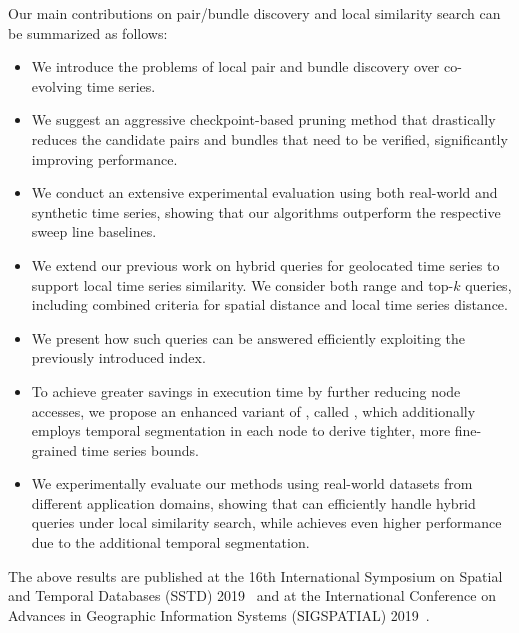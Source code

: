Our main contributions on pair/bundle discovery and local similarity search can be summarized as follows:

\begin{itemize} 
 \item We introduce the problems of local pair and bundle discovery over co-evolving time series.
 \item We suggest an aggressive checkpoint-based pruning method that drastically reduces the candidate pairs and bundles that need to be verified, significantly improving performance.
 \item We conduct an extensive experimental evaluation using both real-world and synthetic time series, showing that our algorithms outperform the respective sweep line baselines.
 \item We extend our previous work on hybrid queries for geolocated time series to support local time series similarity. We consider both range and top-$k$ queries, including combined criteria for spatial distance and local time series distance.
 \item We present how such queries can be answered efficiently exploiting the previously introduced \btsr index.
 \item To achieve greater savings in execution time by further reducing node accesses, we propose an enhanced variant of \btsr, called \sbtsr, which additionally employs temporal segmentation in each node to derive tighter, more fine-grained time series bounds.
 \item We experimentally evaluate our methods using real-world datasets from different application domains, showing that \btsr can efficiently handle hybrid queries under local similarity search, while \sbtsr achieves even higher performance due to the additional temporal segmentation.
\end{itemize}

The above results are published at the 16th International Symposium on Spatial and Temporal Databases (SSTD) 2019~\cite{chatzigeorgakidis2019local} and at the International Conference on Advances in Geographic Information Systems (SIGSPATIAL) 2019~\cite{chatzigeorgakidis2019geolocal}.


